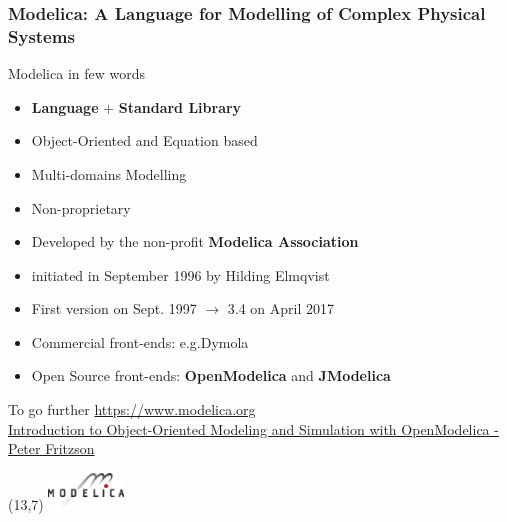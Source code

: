 
\begin{frame}
  \frametitle{Modelica: A Language for Modelling of Complex Physical Systems}
  Modelica in few words
  \begin{itemize}
  \item \textbf{Language} + \textbf{Standard Library}
  \item Object-Oriented and Equation based
  \item Multi-domains Modelling
  \item Non-proprietary
  \item Developed by the non-profit \textbf{Modelica Association}
  \item initiated in September 1996 by Hilding Elmqvist
  \item First version on Sept. 1997  $\rightarrow$ 3.4 on April 2017
  \item Commercial front-ends: e.g.\@ Dymola
  \item Open Source front-ends: \textbf{OpenModelica} and \textbf{JModelica} \\[1em]
  \end{itemize}
  {\tiny%
    \begin{tabbing}
      To go further \=%
      \url{https://www.modelica.org} \\
      \> \href{https://www.openmodelica.org/images/docs/tutorials/modelicatutorialfritzson.pdf}{
        Introduction to Object-Oriented Modeling and Simulation with OpenModelica - Peter Fritzson}
      \end{tabbing}%
    }
  \begin{textblock}{6}(13,7)
    \includegraphics[width=2cm]{images/modelica-logo.jpg}
  \end{textblock}
\end{frame}

